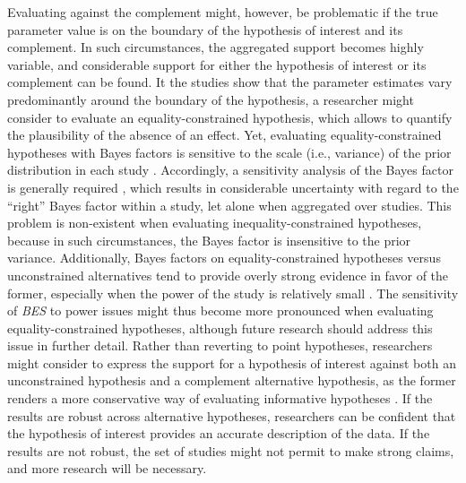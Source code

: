 \documentclass[review, 3p, authoryear]{elsarticle} %
\begin{document}
Evaluating against the complement might, however, be problematic if the true parameter value is on the boundary of the hypothesis of interest and its complement.
In such circumstances, the aggregated support becomes highly variable, and considerable support for either the hypothesis of interest or its complement can be found.
It the studies show that the parameter estimates vary predominantly around the boundary of the hypothesis, a researcher might consider to evaluate an equality-constrained hypothesis, which allows to quantify the plausibility of the absence of an effect.
Yet, evaluating equality-constrained hypotheses with Bayes factors is sensitive to the scale (i.e., variance) of the prior distribution in each study \citep{hoijtink_prior_2021, tendeiro_kiers_2019}.
Accordingly, a sensitivity analysis of the Bayes factor is generally required \citep{hoijtink_prior_2021}, which results in considerable uncertainty with regard to the ``right'' Bayes factor within a study, let alone when aggregated over studies.
This problem is non-existent when evaluating inequality-constrained hypotheses, because in such circumstances, the Bayes factor is insensitive to the prior variance.
Additionally, Bayes factors on equality-constrained hypotheses versus unconstrained alternatives tend to provide overly strong evidence in favor of the former, especially when the power of the study is relatively small \citep[e.g.,][]{tendeiro_kiers_2019}.
The sensitivity of \emph{BES} to power issues might thus become more pronounced when evaluating equality-constrained hypotheses, although future research should address this issue in further detail.
Rather than reverting to point hypotheses, researchers might consider to express the support for a hypothesis of interest against both an unconstrained hypothesis and a complement alternative hypothesis, as the former renders a more conservative way of evaluating informative hypotheses \citep[in line with previous findings by][although this study evaluated hypotheses using an information criterion rather than with Bayes factors]{vanbrabant_complement_2020}.
If the results are robust across alternative hypotheses, researchers can be confident that the hypothesis of interest provides an accurate description of the data.
If the results are not robust, the set of studies might not permit to make strong claims, and more research will be necessary.
\end{document}
